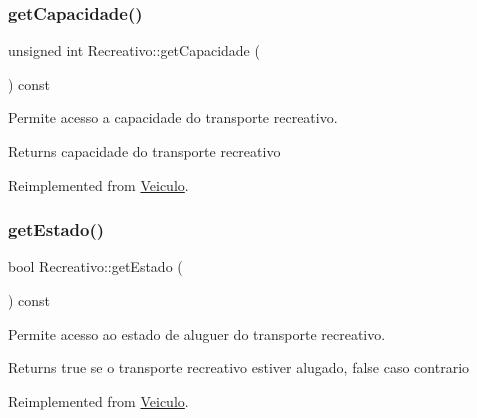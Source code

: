 \mbox{\label{class_recreativo_ac03c531c9508b88ba3ebae98a906063e}} 
\subsubsection{\texorpdfstring{get\+Capacidade()}{getCapacidade()}}
{\footnotesize\ttfamily unsigned int Recreativo\+::get\+Capacidade (\begin{DoxyParamCaption}{ }\end{DoxyParamCaption}) const\hspace{0.3cm}{\ttfamily [virtual]}}



Permite acesso a capacidade do transporte recreativo. 

\begin{DoxyReturn}{Returns}
capacidade do transporte recreativo 
\end{DoxyReturn}


Reimplemented from \mbox{\hyperlink{class_veiculo}{Veiculo}}.

\mbox{\label{class_recreativo_a53798a5ad2a1b230927f29e6aa155272}} 
\subsubsection{\texorpdfstring{get\+Estado()}{getEstado()}}
{\footnotesize\ttfamily bool Recreativo\+::get\+Estado (\begin{DoxyParamCaption}{ }\end{DoxyParamCaption}) const\hspace{0.3cm}{\ttfamily [virtual]}}



Permite acesso ao estado de aluguer do transporte recreativo. 

\begin{DoxyReturn}{Returns}
true se o transporte recreativo estiver alugado, false caso contrario 
\end{DoxyReturn}


Reimplemented from \mbox{\hyperlink{class_veiculo}{Veiculo}}.

\mbox{\label{class_recreativo_a594c854bbcb834cff82c0687afa2b9ce}} 
